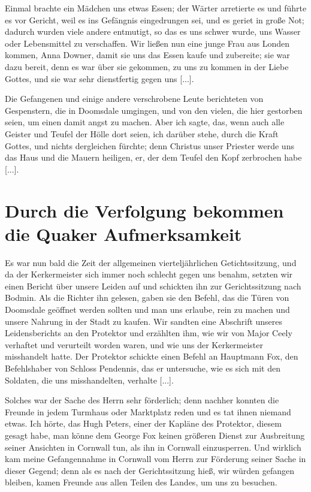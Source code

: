 Einmal brachte ein Mädchen uns etwas
Essen; der Wärter arretierte es und führte es vor Gericht, weil
es ins Gefängnis eingedrungen sei, und es geriet in große Not;
dadurch wurden viele andere entmutigt, so das es uns schwer
wurde, uns Wasser oder Lebensmittel zu verschaffen. Wir ließen
nun eine junge Frau aus Londen kommen, Anna 
Downer, damit
sie uns das Essen kaufe und zubereite; sie war dazu bereit, denn
es war über sie gekommen, zu uns zu kommen in der Liebe
Gottes, und sie war sehr dienstfertig gegen uns [...].


Die Gefangenen und einige andere verschrobene Leute berichteten 
von Gespenstern, die in Doomsdale umgingen, und von
den vielen, die hier gestorben seien, um einen damit angst zu
machen. Aber ich sagte, das, wenn auch alle Geister und Teufel
der Hölle dort seien, ich darüber stehe, durch die Kraft Gottes,
und nichts dergleichen fürchte; denn Christus unser Priester werde
uns das Haus und die Mauern heiligen, er, der dem Teufel den
Kopf zerbrochen habe [...].

\section{Durch die Verfolgung bekommen die Quaker Aufmerksamkeit}

Es war nun bald die Zeit der allgemeinen vierteljährlichen
Getichtssitzung, und da der Kerkermeister sich immer noch schlecht
gegen uns benahm, setzten wir einen Bericht über unsere Leiden
auf und schickten ihn zur Gerichtssitzung nach Bodmin.
 Als die
Richter ihn gelesen, gaben sie den Befehl, das die Türen von
Doomsdale geöffnet werden sollten und man uns erlaube, rein
zu machen und unsere Nahrung in der Stadt zu kaufen. Wir
sandten eine Abschrift unseres Leidensberichts an den Protektor
und erzählten ihm, wie wir von Major Ceely verhaftet und 
verurteilt worden waren, und wie uns der Kerkermeister misshandelt
hatte. Der Protektor schickte einen Befehl an Hauptmann Fox,
den Befehlshaber von Schloss Pendennis, das er untersuche, wie
es sich mit den Soldaten, die uns misshandelten, verhalte [...].


Solches war der Sache des Herrn sehr förderlich; denn
nachher konnten die Freunde in jedem Turmhaus oder Marktplatz 
reden und es tat ihnen niemand etwas. Ich hörte, das
Hugh Peters, einer der Kapläne des 
Protektor, diesem gesagt habe,
man könne dem George Fox keinen größeren Dienst zur 
Ausbreitung seiner Ansichten in Cornwall tun, 
als ihn in Cornwall
einzusperren. Und wirklich kam meine Gefangennahme in Cornwall
vom Herrn zur Förderung seiner Sache in dieser Gegend; denn
als es nach der Gerichtssitzung hieß, wir würden gefangen bleiben,
kamen Freunde aus allen Teilen des Landes, um uns zu besuchen.


